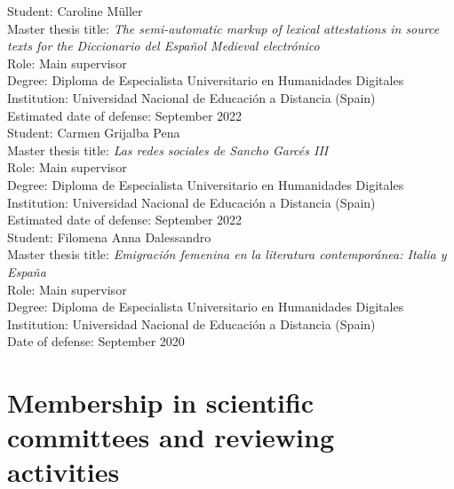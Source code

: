 \documentclass[11pt, a4paper]{article}
\newcommand{\ind}[1]{\textcolor{black!62!white}{\selectfont#1}}
\begin{document}
\ind{Student:} Caroline Müller\\
\ind{Master thesis title:} \textit{The semi-automatic markup of lexical attestations in source texts for the Diccionario del Español
Medieval electrónico}\\
\ind{Role:} Main supervisor\\
\ind{Degree:} Diploma de Especialista Universitario en Humanidades Digitales\\
\ind{Institution:} Universidad Nacional de Educación a Distancia (Spain)\\
\ind{Estimated date of defense:} September 2022\\


\ind{Student:} Carmen Grijalba Pena\\
\ind{Master thesis title:} \textit{Las redes sociales de Sancho Garcés III}\\
\ind{Role:} Main supervisor\\
\ind{Degree:} Diploma de Especialista Universitario en Humanidades Digitales\\
\ind{Institution:} Universidad Nacional de Educación a Distancia (Spain)\\
\ind{Estimated date of defense:} September 2022\\


\ind{Student:} Filomena Anna Dalessandro\\
\ind{Master thesis title:} \textit{Emigración femenina en la literatura contemporánea: Italia y España}\\
\ind{Role:} Main supervisor\\
\ind{Degree:} Diploma de Especialista Universitario en Humanidades Digitales\\
\ind{Institution:} Universidad Nacional de Educación a Distancia (Spain)\\
\ind{Date of defense:} September 2020

\section{Membership in scientific committees and reviewing activities}
\end{document}
